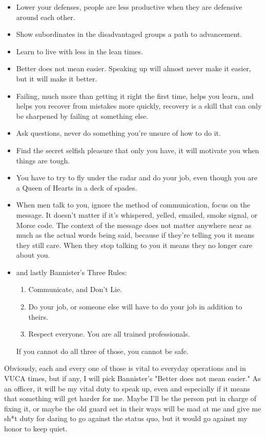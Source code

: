\documentclass{article}
\begin{document}
\begin{itemize}
        \item Lower your defenses, people are less productive when they are defensive around each other.
        \item Show subordinates in the disadvantaged groups a path to advancement.
        \item Learn to live with less in the lean times.
        \item Better does not mean easier. Speaking up will almost never make it easier, but it will make it better.
        \item Failing, much more than getting it right the first time, helps you learn, and helps you recover from mistakes more quickly, recovery is a skill that can only be sharpened by failing at something else.
        \item Ask questions, never do something you're unsure of how to do it.
        \item Find the secret selfish pleasure that only you have, it will motivate you when things are tough.
        \item You have to try to fly under the radar and do your job, even though you are a Queen of Hearts in a deck of spades.
        \item When men talk to you, ignore the method of communication, focus on the message. It doesn't matter if it's whispered, yelled, emailed, smoke signal, or Morse code. The context of the message does not matter anywhere near as much as the actual words being said, because if they're telling you it means they still care. When they stop talking to you it means they no longer care about you.
        \item and lastly Bannister's Three Rules: \begin{enumerate}
            \item Communicate, and Don't Lie.
            \item Do your job, or someone else will have to do your job in addition to theirs.
            \item Respect everyone. You are all trained professionals.
        \end{enumerate} If you cannot do all three of those, you cannot be safe.
  
\end{itemize}
  Obviously, each and every one of those is vital to everyday operations and in VUCA times, but if any, I will pick Bannister's "Better does not mean easier." As an officer, it will be my vital duty to speak up, even and especially if it means that something will get harder for me. Maybe I'll be the person put in charge of fixing it, or maybe the old guard set in their ways will be mad at me and give me sh*t duty for daring to go against the status quo, but it would go against my honor to keep quiet.
\end{document}
